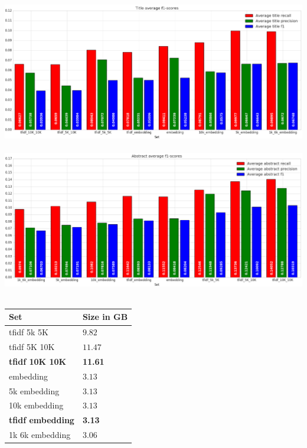 \documentclass[../../Thesis.tex]{subfiles}
\begin{document}
\includegraphics[width=6in]{Plots/Title_avg_f1}\\
\\
\includegraphics[width=6in]{Plots/Abstract_avg_f1}\\
\\


\begin{tabular}{|l|l|}
\hline
Set & Size in GB\\
\hline
tfidf 5k 5K & $9.82$ \\
\hline
tfidf 5K 10K & $11.47$ \\
\hline
\textbf{tfidf 10K 10K} &\textbf{11.61}\\
\hline
embedding & $3.13$ \\
\hline
5k embedding & $3.13$ \\
\hline
10k embedding & $3.13$ \\
\hline
\textbf{tfidf embedding} & \textbf{3.13} \\
\hline
1k 6k embedding & $3.06$ \\
\hline
\end{tabular}
\end{document}
